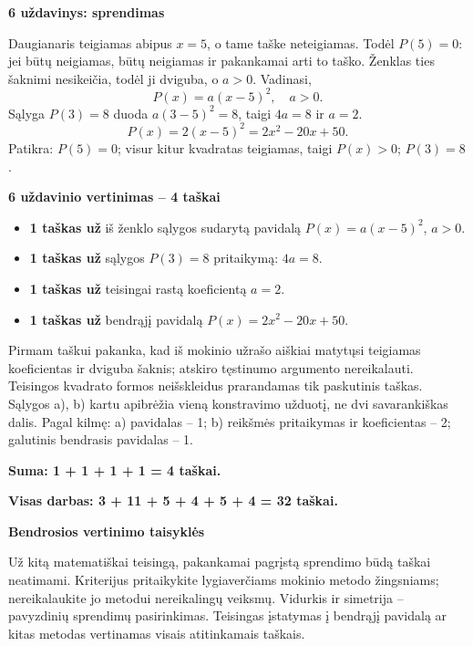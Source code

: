 \documentclass[11pt]{article}
\newcommand{\sk}[1]{\par\medskip\textbf{#1}\par}
\begin{document}
\sk{6 uždavinys: sprendimas}
Daugianaris teigiamas abipus $x=5$, o tame taške neteigiamas. Todėl $P(5)=0$: jei būtų neigiamas, būtų neigiamas ir pakankamai arti to taško. Ženklas ties šaknimi nesikeičia, todėl ji dviguba, o $a>0$. Vadinasi,
\[P(x)=a(x-5)^2,\quad a>0.\]
Sąlyga $P(3)=8$ duoda $a(3-5)^2=8$, taigi $4a=8$ ir $a=2$.
\[\boxed{P(x)=2(x-5)^2=2 x^{2} - 20 x + 50.}\]
Patikra: $P(5)=0$; visur kitur kvadratas teigiamas, taigi $P(x)>0$; $P(3)=8$.

\sk{6 uždavinio vertinimas -- 4 taškai}
\begin{itemize}
\item \textbf{1 taškas už} iš ženklo sąlygos sudarytą pavidalą $P(x)=a(x-5)^2$, $a>0$.
\item \textbf{1 taškas už} sąlygos $P(3)=8$ pritaikymą: $4a=8$.
\item \textbf{1 taškas už} teisingai rastą koeficientą $a=2$.
\item \textbf{1 taškas už} bendrąjį pavidalą $P(x)=2 x^{2} - 20 x + 50$.
\end{itemize}
Pirmam taškui pakanka, kad iš mokinio užrašo aiškiai matytųsi teigiamas koeficientas ir dviguba šaknis; atskiro tęstinumo argumento nereikalauti. Teisingos kvadrato formos neišskleidus prarandamas tik paskutinis taškas. Sąlygos a), b) kartu apibrėžia vieną konstravimo užduotį, ne dvi savarankiškas dalis. Pagal kilmę: a) pavidalas -- 1; b) reikšmės pritaikymas ir koeficientas -- 2; galutinis bendrasis pavidalas -- 1.\par\textbf{Suma: 1 + 1 + 1 + 1 = 4 taškai.}\par\textbf{Visas darbas: 3 + 11 + 5 + 4 + 5 + 4 = 32 taškai.}\newpage
\sk{Bendrosios vertinimo taisyklės}
Už kitą matematiškai teisingą, pakankamai pagrįstą sprendimo būdą taškai neatimami. Kriterijus pritaikykite lygiaverčiams mokinio metodo žingsniams; nereikalaukite jo metodui nereikalingų veiksmų. Vidurkis ir simetrija -- pavyzdinių sprendimų pasirinkimas. Teisingas įstatymas į bendrąjį pavidalą ar kitas metodas vertinamas visais atitinkamais taškais.
\end{document}
